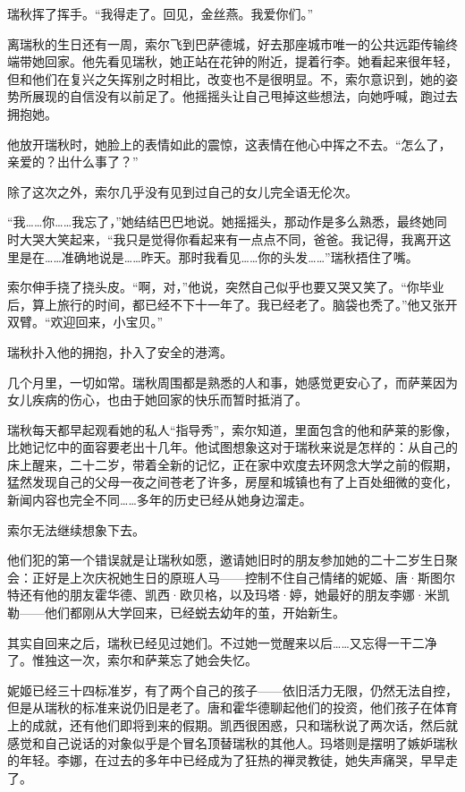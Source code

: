 \documentclass[AutoFakeBold=true]{book}
\begin{document}
瑞秋挥了挥手。``我得走了。回见，金丝燕。我爱你们。''

\vspace*{1em}

离瑞秋的生日还有一周，索尔飞到巴萨德城，好去那座城市唯一的公共远距传输终端带她回家。他先看见瑞秋，她正站在花钟的附近，提着行李。她看起来很年轻，但和他们在复兴之矢挥别之时相比，改变也不是很明显。不，索尔意识到，她的姿势所展现的自信没有以前足了。他摇摇头让自己甩掉这些想法，向她呼喊，跑过去拥抱她。

他放开瑞秋时，她脸上的表情如此的震惊，这表情在他心中挥之不去。``怎么了，亲爱的？出什么事了？''

除了这次之外，索尔几乎没有见到过自己的女儿完全语无伦次。

``我……你……我忘了，''她结结巴巴地说。她摇摇头，那动作是多么熟悉，最终她同时大哭大笑起来，``我只是觉得你看起来有一点点不同，爸爸。我记得，我离开这里是在……准确地说是……昨天。那时我看见……你的头发……''瑞秋捂住了嘴。

索尔伸手挠了挠头皮。``啊，对，''他说，突然自己似乎也要又哭又笑了。``你毕业后，算上旅行的时间，都已经不下十一年了。我已经老了。脑袋也秃了。''他又张开双臂。``欢迎回来，小宝贝。''

瑞秋扑入他的拥抱，扑入了安全的港湾。

\vspace*{1em}

几个月里，一切如常。瑞秋周围都是熟悉的人和事，她感觉更安心了，而萨莱因为女儿疾病的伤心，也由于她回家的快乐而暂时抵消了。

瑞秋每天都早起观看她的私人``指导秀''，索尔知道，里面包含的他和萨莱的影像，比她记忆中的面容要老出十几年。他试图想象这对于瑞秋来说是怎样的：从自己的床上醒来，二十二岁，带着全新的记忆，正在家中欢度去环网念大学之前的假期，猛然发现自己的父母一夜之间苍老了许多，房屋和城镇也有了上百处细微的变化，新闻内容也完全不同……多年的历史已经从她身边溜走。

索尔无法继续想象下去。

\vspace*{1em}

他们犯的第一个错误就是让瑞秋如愿，邀请她旧时的朋友参加她的二十二岁生日聚会：正好是上次庆祝她生日的原班人马——控制不住自己情绪的妮姬、唐·斯图尔特还有他的朋友霍华德、凯西·欧贝格，以及玛塔·婷，她最好的朋友李娜·米凯勒——他们都刚从大学回来，已经蜕去幼年的茧，开始新生。

其实自回来之后，瑞秋已经见过她们。不过她一觉醒来以后……又忘得一干二净了。惟独这一次，索尔和萨莱忘了她会失忆。

妮姬已经三十四标准岁，有了两个自己的孩子——依旧活力无限，仍然无法自控，但是从瑞秋的标准来说仍旧是老了。唐和霍华德聊起他们的投资，他们孩子在体育上的成就，还有他们即将到来的假期。凯西很困惑，只和瑞秋说了两次话，然后就感觉和自己说话的对象似乎是个冒名顶替瑞秋的其他人。玛塔则是摆明了嫉妒瑞秋的年轻。李娜，在过去的多年中已经成为了狂热的禅灵教徒，她失声痛哭，早早走了。
\end{document}
